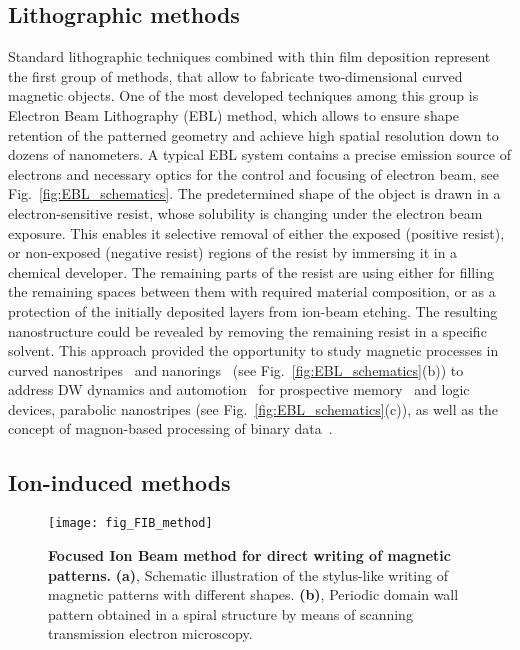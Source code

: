 \subsection{Lithographic methods}

Standard lithographic techniques combined with thin film deposition represent the first group of methods, that allow to fabricate two-dimensional curved magnetic objects. One of the most developed techniques among this group is Electron Beam Lithography (EBL) method, which allows to ensure shape retention of the patterned geometry and achieve high spatial resolution down to dozens of nanometers. A typical EBL system contains a precise emission source of electrons and necessary optics for the control and focusing of electron beam, see Fig.~\ref{fig:EBL_schematics}. The predetermined shape of the object is drawn in a electron-sensitive resist, whose solubility is changing under the electron beam exposure. This enables it selective removal of either the exposed (positive resist), or non-exposed (negative resist) regions of the resist by immersing it in a chemical developer. The remaining parts of the resist are using either for filling the remaining spaces between them with required material composition, or as a protection of the initially deposited layers from ion-beam etching. The resulting nanostructure could be revealed by removing the remaining resist in a specific solvent. This approach provided the opportunity to study magnetic processes in curved nanostripes~\cite{Lewis09,Nahrwold09,Glathe12} and nanorings~\cite{Castano03,Klaui03a,Klaui05a,Klaui08,Richter16,Mawass17} (see Fig.~\ref{fig:EBL_schematics}(b)) to address DW dynamics and automotion~\cite{Mawass17} for prospective memory~\cite{Hayashi07,Parkin08,Parkin15} and logic~\cite{Allwood02,Allwood04,Allwood05,Hrkac11} devices, parabolic nanostripes (see Fig.~\ref{fig:EBL_schematics}(c)), as well as the concept of magnon-based processing of binary data~\cite{Schneider08,Lee08e,Vogt12,Vogt14,Chumak15}.



\subsection{Ion-induced methods}

\begin{figure}[t]
	\centering
	\texttt{[image: fig\_FIB\_method]}
	\caption{\label{fig:FIB_schematics}%
		\textbf{Focused Ion Beam method for direct writing of magnetic patterns.} \textbf{(a)}, Schematic illustration of the stylus-like writing of magnetic patterns with different shapes. \textbf{(b)}, Periodic domain wall pattern obtained in a spiral structure by means of scanning transmission electron microscopy.
	}
\end{figure}


